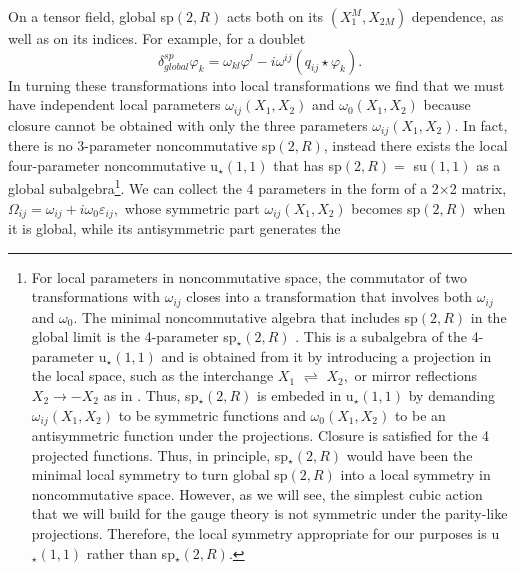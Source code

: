 \documentclass[a4paper,12pt]{article}
\begin{document}
On a tensor field, global sp$\left( 2,R\right) $ acts both on its $\left(
X_{1}^{M},X_{2M}\right) $ dependence, as well as on its indices. For
example, for a doublet 
\begin{equation}
\delta _{global}^{sp}\varphi _{k}=\omega _{kl}\varphi ^{l}-i\omega
^{ij}\left( q_{ij}\star \varphi _{k}\right) .
\end{equation}
In turning these transformations into local transformations we find that we
must have independent local parameters $\omega _{ij}\left(
X_{1},X_{2}\right) $ and $\omega _{0}\left( X_{1},X_{2}\right) $ because
closure cannot be obtained with only the three parameters $\omega
_{ij}\left( X_{1},X_{2}\right) .$ In fact, there is no 3-parameter
noncommutative sp$\left( 2,R\right) $, instead there exists the local
four-parameter noncommutative u$_{\star }\left( 1,1\right) $ that has sp$%
\left( 2,R\right) =$ su$\left( 1,1\right) $ as a global subalgebra\footnote{%
For local parameters in noncommutative space, the commutator of two
transformations with $\omega _{ij}$ closes into a transformation that
involves both $\omega _{ij}$ and $\omega _{0}.$ The minimal noncommutative
algebra that includes sp$\left( 2,R\right) $ in the global limit is the
4-parameter sp$_{\star }\left( 2,R\right) $ \cite{ncOn}. This is a
subalgebra of the 4-parameter u$_{\star }\left( 1,1\right) $ and is obtained
from it by introducing a projection in the local space, such as the
interchange $X_{1}$ $\rightleftharpoons $ $X_{2},$ or mirror reflections $%
X_{2}\rightarrow -X_{2}$ as in \cite{ncOn}$.$ Thus, sp$_{\star }\left(
2,R\right) $ is embeded in u$_{\star }\left( 1,1\right) $ by demanding $%
\omega _{ij}\left( X_{1},X_{2}\right) $ to be symmetric functions and $%
\omega _{0}\left( X_{1},X_{2}\right) $ to be an antisymmetric function under
the projections. Closure is satisfied for the 4 projected functions. Thus,
in principle, sp$_{\star }\left( 2,R\right) $ would have been the minimal
local symmetry to turn global sp$\left( 2,R\right) $ into a local symmetry
in noncommutative space. However, as we will see, the simplest cubic action
that we will build for the gauge theory is not symmetric under the
parity-like projections. Therefore, the local symmetry appropriate for our
purposes is u$_{\star }\left( 1,1\right) $ rather than sp$_{\star }\left(
2,R\right) .$}. We can collect the 4 parameters in the form of a 2$\times $2
matrix, $\Omega _{ij}=\omega _{ij}+i\omega _{0}\varepsilon _{ij},$ whose
symmetric part $\omega _{ij}\left( X_{1},X_{2}\right) $ becomes sp$\left(
2,R\right) $ when it is global, while its antisymmetric part generates the
\end{document}
